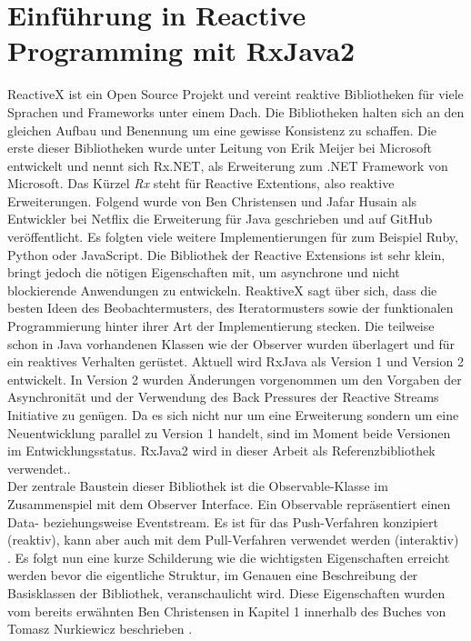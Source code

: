 \chapter{Einführung in Reactive Programming mit RxJava2}\label{rp_einfuehrung}
ReactiveX ist ein Open Source Projekt und vereint reaktive Bibliotheken für viele Sprachen und Frameworks unter einem Dach. Die Bibliotheken halten sich an den gleichen Aufbau und Benennung um eine gewisse Konsistenz zu schaffen. Die erste dieser Bibliotheken wurde unter Leitung von Erik Meijer bei Microsoft entwickelt und nennt sich Rx.NET, als Erweiterung zum .NET Framework von Microsoft. Das Kürzel \textit{Rx} steht für Reactive Extentions, also reaktive Erweiterungen. Folgend wurde von Ben Christensen und Jafar Husain als Entwickler bei Netflix die Erweiterung für Java geschrieben und auf GitHub veröffentlicht. Es folgten viele weitere Implementierungen für zum Beispiel Ruby, Python oder JavaScript. Die Bibliothek der Reactive Extensions ist sehr klein, bringt jedoch die nötigen Eigenschaften mit, um asynchrone und nicht blockierende Anwendungen zu entwickeln. ReaktiveX sagt über sich, dass die besten Ideen des Beobachtermusters, des Iteratormusters sowie der funktionalen Programmierung hinter ihrer Art der Implementierung stecken. Die teilweise schon in Java vorhandenen Klassen wie der Observer wurden überlagert und für ein reaktives Verhalten gerüstet. Aktuell wird RxJava als Version 1 und Version 2 entwickelt. In Version 2 wurden Änderungen vorgenommen um den Vorgaben der Asynchronität und der Verwendung des Back Pressures der Reactive Streams Initiative zu genügen. Da es sich nicht nur um eine Erweiterung sondern um eine Neuentwicklung parallel zu Version 1 handelt, sind im Moment beide Versionen im Entwicklungsstatus. RxJava2 wird in dieser Arbeit als Referenzbibliothek verwendet.\cite{rxgit}.\\ Der zentrale Baustein dieser Bibliothek ist die Observable-Klasse im Zusammenspiel mit dem Observer Interface. Ein Observable repräsentiert einen Data- beziehungsweise Eventstream. Es ist für das Push-Verfahren konzipiert (reaktiv), kann aber auch mit dem Pull-Verfahren verwendet werden (interaktiv) \cite{Nurkiewicz.2017}. Es folgt nun eine kurze Schilderung wie die wichtigsten Eigenschaften erreicht werden bevor die eigentliche Struktur, im Genauen eine Beschreibung der Basisklassen der Bibliothek, veranschaulicht wird. Diese Eigenschaften wurden vom bereits erwähnten Ben Christensen in Kapitel 1 innerhalb des Buches von Tomasz Nurkiewicz beschrieben \cite{Nurkiewicz.2017}. 
